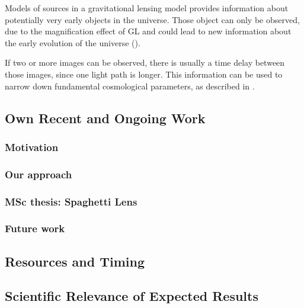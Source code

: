\documentclass[11pt]{article}
\begin{document}
Models of sources in a gravitational lensing model provides information about potentially very early objects in the universe.
Those object can only be observed, due to the magnification effect of GL and could lead to new information about the early evolution of the universe (\cite{rusin03}).

If two or more images can be observed, there is usually a time delay between those images, since one light path is longer.
This information can be used to narrow down fundamental cosmological parameters, as described in \cite{refsdal1964}.


\subsection{Own Recent and Ongoing Work}

\subsubsection{Motivation}

\subsubsection{Our approach}

\subsubsection{MSc thesis: Spaghetti Lens}

\subsubsection{Future work}


\subsection{Resources and Timing}


\subsection{Scientific Relevance of Expected Results}





\end{document}
